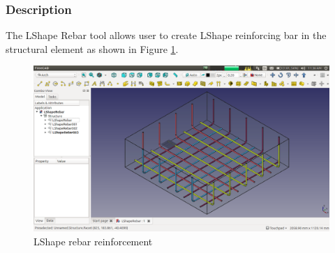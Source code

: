 \subsubsection{Description}
The LShape Rebar tool allows user to create LShape reinforcing bar in the structural element as shown in Figure \ref{lshaperebar}.
\begin{figure}
    \centering \includegraphics[scale=0.35]{images/LShapeRebarNew.png}
    \caption{LShape rebar reinforcement}
    \label{lshaperebar}
\end{figure}
